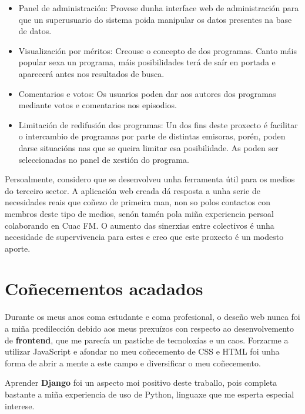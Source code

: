 \begin{itemize}
	
	\item Panel de administración: Provese dunha interface web de administración para que un superusuario do sistema poida manipular os datos presentes na base de datos.
	
	\item Visualización por méritos: Creouse o concepto de  dos programas. Canto máis popular sexa un programa, máis posibilidades terá de saír en portada e aparecerá antes nos resultados de busca.
	
	\item Comentarios e votos: Os usuarios poden dar  aos autores dos programas mediante votos e comentarios nos episodios.
	
	\item Limitación de redifusión dos programas: Un dos fins deste proxecto é facilitar o intercambio de programas por parte de distintas emisoras, porén, poden darse situacións nas que se queira limitar esa posibilidade. As  poden ser seleccionadas no panel de xestión do programa.
	
\end{itemize}


Persoalmente, considero que se desenvolveu unha ferramenta útil para os medios do terceiro sector. A aplicación web creada dá resposta a unha serie de necesidades reais que coñezo de primeira man, non so polos contactos con membros deste tipo de medios, senón tamén pola miña experiencia persoal colaborando en Cuac FM. O aumento das sinerxias entre colectivos é unha necesidade de supervivencia para estes e creo que este proxecto é un modesto aporte.   


\section{Coñecementos acadados}

Durante os meus anos coma estudante e coma profesional, o deseño web nunca foi a miña predilección debido aos meus prexuízos con respecto ao desenvolvemento de \textbf{frontend}, que me parecía un pastiche de tecnoloxías e un caos. Forzarme a utilizar JavaScript e afondar no meu coñecemento de CSS e HTML foi unha forma de abrir a mente a este campo e diversificar o meu coñecemento.

Aprender \textbf{Django} foi un aspecto moi positivo deste traballo, pois completa bastante a miña experiencia de uso de Python, linguaxe que me esperta especial interese.

